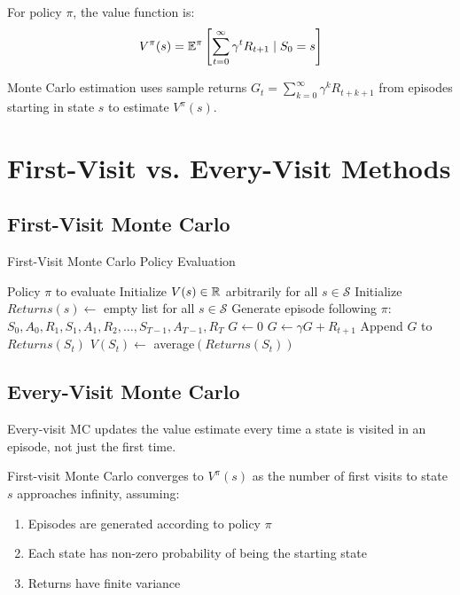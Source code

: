 For policy $\pi$, the value function is:
\begin{equation}
V^\pi(s) = \mathbb{E}^\pi\left[\sum_{t=0}^\infty \gamma^t R_{t+1} \mid S_0 = s\right]
\end{equation}

Monte Carlo estimation uses sample returns $G_t = \sum_{k=0}^\infty \gamma^k R_{t+k+1}$ from episodes starting in state $s$ to estimate $V^\pi(s)$.

\section{First-Visit vs. Every-Visit Methods}

\subsection{First-Visit Monte Carlo}

\begin{algorithm}
\caption{First-Visit Monte Carlo Policy Evaluation}
\begin{algorithmic}
\REQUIRE Policy $\pi$ to evaluate
\STATE Initialize $V(s) \in \mathbb{R}$ arbitrarily for all $s \in \mathcal{S}$
\STATE Initialize $Returns(s) \leftarrow$ empty list for all $s \in \mathcal{S}$
\REPEAT
    \STATE Generate episode following $\pi$: $S_0, A_0, R_1, S_1, A_1, R_2, \ldots, S_{T-1}, A_{T-1}, R_T$
    \STATE $G \leftarrow 0$
        \STATE $G \leftarrow \gamma G + R_{t+1}$
            \STATE Append $G$ to $Returns(S_t)$
            \STATE $V(S_t) \leftarrow$ average$(Returns(S_t))$
        \ENDIF
    \ENDFOR
{}
\end{algorithmic}
\end{algorithm}

\subsection{Every-Visit Monte Carlo}

Every-visit MC updates the value estimate every time a state is visited in an episode, not just the first time.

\begin{theorem}
First-visit Monte Carlo converges to $V^\pi(s)$ as the number of first visits to state $s$ approaches infinity, assuming:
\begin{enumerate}
    \item Episodes are generated according to policy $\pi$
    \item Each state has non-zero probability of being the starting state
    \item Returns have finite variance
\end{enumerate}
\end{theorem}

